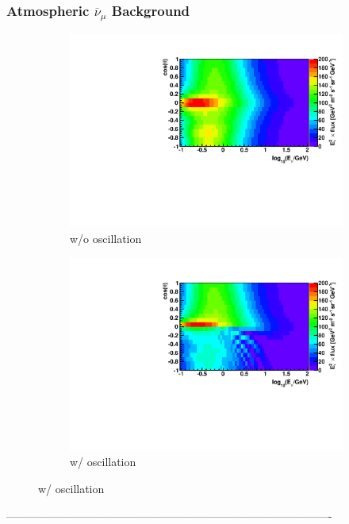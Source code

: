 \documentclass{beamer}
\begin{document}
\begin{frame}
	\frametitle{Atmospheric $\overline{\nu}_{\mu}$ Background}
	\begin{figure}
		\centering
		\begin{subfigure}[b]{0.49\linewidth}
			\caption{ w/o oscillation }
			\includegraphics[width=\linewidth]{atm_numubar_hist.pdf}
		\end{subfigure}
		\begin{subfigure}[b]{0.49\linewidth}
			\caption{ w/ oscillation }
			\includegraphics[width=\linewidth]{atm_numubar_osc_hist.pdf}
		\end{subfigure}
	\end{figure}
\end{frame}

----------------------------------------------------------------------------------------
\end{document}
